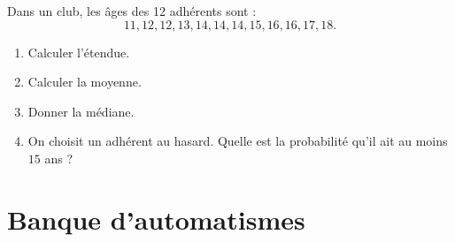 \documentclass[11pt,a4paper]{article}
\newcounter{exercice}
\begin{document}
\begin{exercice}
Dans un club, les âges des 12 adhérents sont :
\[
11,12,12,13,14,14,14,15,16,16,17,18.
\]
\begin{enumerate}
  \item Calculer l'étendue.
  \item Calculer la moyenne.
  \item Donner la médiane.
  \item On choisit un adhérent au hasard. Quelle est la probabilité qu'il ait au moins $15$ ans ?
\end{enumerate}
\end{exercice}
\newpage
\section{Banque d'automatismes}
\end{document}
